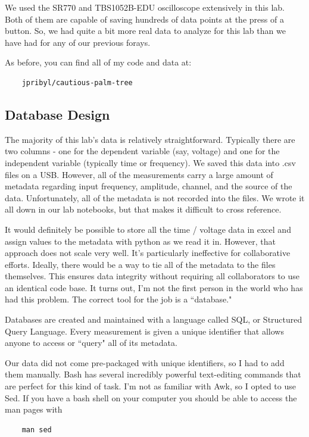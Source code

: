 \documentclass{article}
\begin{document}
We used the SR770 and TBS1052B-EDU oscilloscope extensively in this lab. Both
of them are capable of saving hundreds of data points at the press of a button.
So, we had quite a bit more real data to analyze for this lab than we have had
for any of our previous forays.

As before, you can find all of my code and data at:
\begin{verbatim}
    jpribyl/cautious-palm-tree
\end{verbatim}

\subsection{Database Design}%

The majority of this lab's data is relatively straightforward. Typically there
are two columns - one for the dependent variable (say, voltage) and one for the
independent variable (typically time or frequency). We saved this data into
.csv files on a USB. However, all of the measurements carry a large amount of
metadata regarding input frequency, amplitude, channel, and the source of the
data. Unfortunately, all of the metadata is not recorded into the files. We
wrote it all down in our lab notebooks, but that makes it difficult to cross
reference.

It would definitely be possible to store all the time / voltage data in excel
and assign values to the metadata with python as we read it in. However, that
approach does not scale very well. It's particularly ineffective for
collaborative efforts. Ideally, there would be a way to tie all of the
metadata to the files themselves. This ensures data integrity without
requiring all collaborators to use an identical code base. It turns out, I'm
not the first person in the world who has had this problem. The correct tool
for the job is a ``database." 

Databases are created and maintained with a language called SQL, or Structured
Query Language. Every measurement is given a unique identifier that allows
anyone to access or ``query" all of its metadata.

Our data did not come pre-packaged with unique identifiers, so I had to add
them manually. Bash has several incredibly powerful text-editing commands that
are perfect for this kind of task. I'm not as familiar with Awk, so I opted to
use Sed. If you have a bash shell on your computer you should be able to access
the man pages with 

\begin{verbatim}
    man sed
\end{verbatim}
\end{document}
